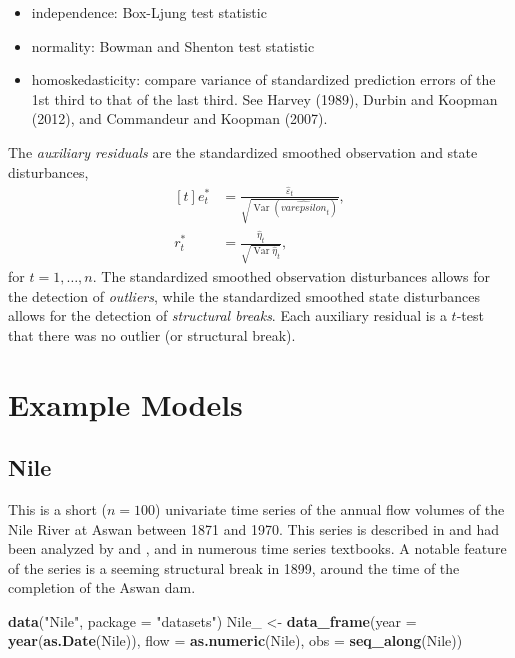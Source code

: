 \documentclass[]{book}
\newenvironment{Shaded}{\begin{snugshade}}{\end{snugshade}}
\newcommand{\KeywordTok}[1]{\textcolor[rgb]{0.13,0.29,0.53}{\textbf{{#1}}}}
\newcommand{\DataTypeTok}[1]{\textcolor[rgb]{0.13,0.29,0.53}{{#1}}}
\newcommand{\StringTok}[1]{\textcolor[rgb]{0.31,0.60,0.02}{{#1}}}
\newcommand{\NormalTok}[1]{{#1}}
\providecommand{\tightlist}{%
  \setlength{\itemsep}{0pt}\setlength{\parskip}{0pt}}
\DeclareMathOperator{\Var}{Var}
\begin{document}
\begin{itemize}
\tightlist
\item
  independence: Box-Ljung test statistic
\item
  normality: Bowman and Shenton test statistic
\item
  homoskedasticity: compare variance of standardized prediction errors
  of the 1st third to that of the last third. See Harvey (1989), Durbin
  and Koopman (2012), and Commandeur and Koopman (2007).
\end{itemize}

The \emph{auxiliary residuals} are the standardized smoothed observation
and state disturbances, \[
\begin{aligned}[t]
e^*_t &= \frac{\hat{\varepsilon}_t}{\sqrt{\Var(\hat{varepsilon}_t)}} , \\
r^*_t &= \frac{\hat{\eta}_t}{\sqrt{\Var{\hat{\eta}_t}}} ,
\end{aligned}
\] for \(t = 1, \dots, n\). The standardized smoothed observation
disturbances allows for the detection of \emph{outliers}, while the
standardized smoothed state disturbances allows for the detection of
\emph{structural breaks}. Each auxiliary residual is a \(t\)-test that
there was no outlier (or structural break).

\chapter{Example Models}\label{example-models}

\section{Nile}\label{nile}

This is a short (\(n = 100\)) univariate time series of the annual flow
volumes of the Nile River at Aswan between 1871 and 1970. This series is
described in \textcite{DurbinKoopman2012} and had been analyzed by
\textcite{Cobb1978} and \textcite{Balke1993}, and in numerous time
series textbooks. A notable feature of the series is a seeming
structural break in 1899, around the time of the completion of the Aswan
dam.

\begin{Shaded}
\begin{Highlighting}[]
\KeywordTok{data}\NormalTok{(}\StringTok{"Nile"}\NormalTok{, }\DataTypeTok{package =} \StringTok{"datasets"}\NormalTok{)}
\NormalTok{Nile_ <-}\StringTok{ }\KeywordTok{data_frame}\NormalTok{(}\DataTypeTok{year =} \KeywordTok{year}\NormalTok{(}\KeywordTok{as.Date}\NormalTok{(Nile)),}
                    \DataTypeTok{flow =} \KeywordTok{as.numeric}\NormalTok{(Nile),}
                    \DataTypeTok{obs =} \KeywordTok{seq_along}\NormalTok{(Nile))}
\end{Highlighting}
\end{Shaded}
\end{document}
